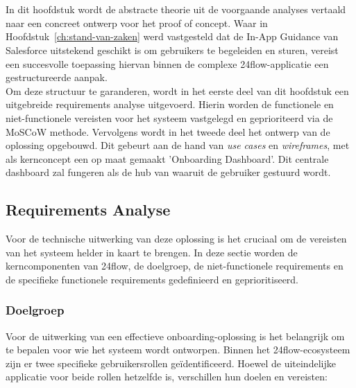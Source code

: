 \chapter{}%
\label{ch:requirements-ontwerp}

In dit hoofdstuk wordt de abstracte theorie uit de voorgaande analyses vertaald naar een concreet ontwerp voor het proof of concept. Waar in Hoofdstuk~\ref{ch:stand-van-zaken} werd vastgesteld dat de In-App Guidance van Salesforce uitstekend geschikt is om gebruikers te begeleiden en sturen, vereist een succesvolle toepassing hiervan binnen de complexe 24flow-applicatie een gestructureerde aanpak. 
\\

Om deze structuur te garanderen, wordt in het eerste deel van dit hoofdstuk een uitgebreide requirements analyse uitgevoerd. Hierin worden de functionele en niet-functionele vereisten voor het systeem vastgelegd en geprioriteerd via de MoSCoW methode. Vervolgens wordt in het tweede deel het ontwerp van de oplossing opgebouwd. Dit gebeurt aan de hand van \textit{use cases} en \textit{wireframes}, met als kernconcept een op maat gemaakt 'Onboarding Dashboard'. Dit centrale dashboard zal fungeren als de hub van waaruit de gebruiker gestuurd wordt.

\section{Requirements Analyse}%
\label{sec:Requirements analyse}
Voor de technische uitwerking van deze oplossing is het cruciaal om de vereisten van het systeem helder in kaart te brengen. In deze sectie worden de kerncomponenten van 24flow, de doelgroep, de niet-functionele requirements en de specifieke functionele requirements gedefinieerd en geprioritiseerd.

\subsection{Doelgroep}
\label{subsec:doelgroepanalyse}
Voor de uitwerking van een effectieve onboarding-oplossing is het belangrijk om te bepalen voor wie het systeem wordt ontworpen. Binnen het 24flow-ecosysteem zijn er twee specifieke gebruikersrollen geïdentificeerd. Hoewel de uiteindelijke applicatie voor beide rollen hetzelfde is, verschillen hun doelen en vereisten:
\\


